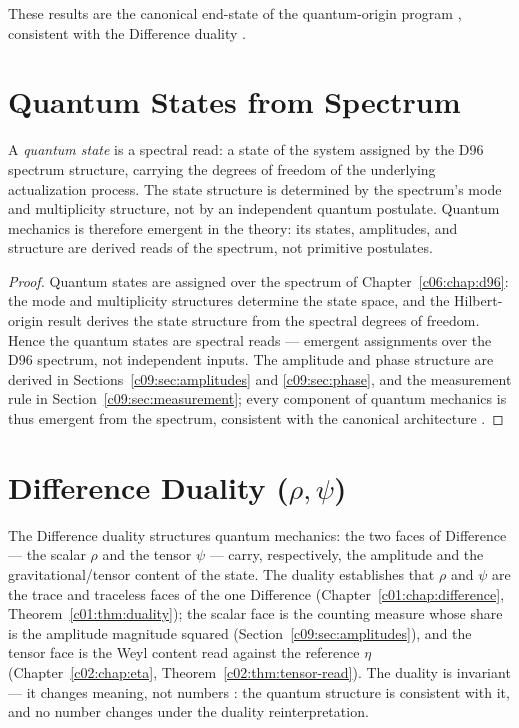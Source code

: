 These results are the canonical end-state of the quantum-origin program
\cite{c09:QG216,c09:QG218,c09:QG220,c09:QG223,c09:QG243,c09:QG244}, consistent with the Difference duality
\cite{c09:QG286,c09:QG301}.

\section{Quantum States from Spectrum}
\label{c09:sec:states-from-spectrum}

\begin{theorem}
\label{c09:thm:states-spectral}
A \emph{quantum state} is a spectral read: a state of the system assigned by the D96
spectrum structure, carrying the degrees of freedom of the underlying actualization
process. The state structure is determined by the spectrum's mode and multiplicity
structure, not by an independent quantum postulate. Quantum mechanics is therefore
emergent in the theory: its states, amplitudes, and structure are derived reads of the
spectrum, not primitive postulates.
\end{theorem}

\begin{proof}
Quantum states are assigned over the spectrum of Chapter~\ref{c06:chap:d96}: the mode and
multiplicity structures determine the state space, and the Hilbert-origin result
\cite{c09:QG218} derives the state structure from the spectral degrees of freedom. Hence the
quantum states are spectral reads --- emergent assignments over the D96 spectrum, not
independent inputs. The amplitude and phase structure are derived in
Sections~\ref{c09:sec:amplitudes} and \ref{c09:sec:phase}, and the measurement rule in
Section~\ref{c09:sec:measurement}; every component of quantum mechanics is thus emergent from
the spectrum, consistent with the canonical architecture \cite{c09:QG223}.
\end{proof}

\section{Difference Duality (\texorpdfstring{$\rho,\psi$}{rho, psi})}
\label{c09:sec:duality}

The Difference duality structures quantum mechanics: the two faces of Difference --- the
scalar $\rho$ and the tensor $\psi$ --- carry, respectively, the amplitude and the
gravitational/tensor content of the state. The duality \cite{c09:QG286} establishes that
$\rho$ and $\psi$ are the trace and traceless faces of the one Difference
(Chapter~\ref{c01:chap:difference}, Theorem~\ref{c01:thm:duality}); the scalar face is the
counting measure whose share is the amplitude magnitude squared
(Section~\ref{c09:sec:amplitudes}), and the tensor face is the Weyl content read against the
reference $\eta$ (Chapter~\ref{c02:chap:eta}, Theorem~\ref{c02:thm:tensor-read}). The duality
is invariant --- it changes meaning, not numbers \cite{c09:QG301}: the quantum structure is
consistent with it, and no number changes under the duality reinterpretation.


